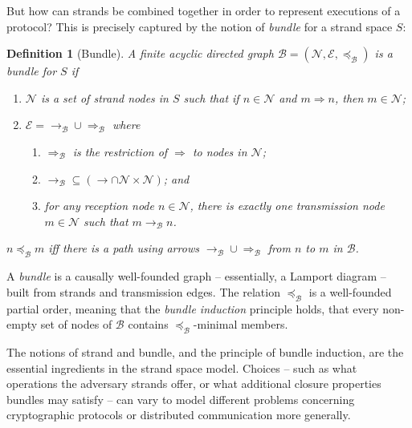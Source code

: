\documentclass[copyright]{eptcs}
\newcommand{\bnd}{\mathcal{B}}
\newtheorem{definition}{Definition}
\begin{document}
But how can strands be combined together in order to represent
executions of a protocol? This is precisely captured by the notion of
{\em bundle} for a strand space $S$:
\begin{definition}[Bundle] 
A finite acyclic directed graph
  $\bnd=(\mathcal{N},\mathcal{E},\preceq_{\bnd})$ is a \emph{bundle}
  for $S$ if
  \begin{enumerate}

  \item $\mathcal{N}$ is a set of strand nodes in $S$ such that if
    $n\in\mathcal{N}$ and $m\Rightarrow n$, then $m\in\mathcal{N}$;
    
  \item $\mathcal{E}=\rightarrow_{\bnd}\cup\Rightarrow_{\bnd}$ where
  \begin{enumerate}
    \item $\Rightarrow_{\bnd}$ is the restriction of $\Rightarrow$ to
    nodes in $\mathcal{N}$;
    \item $\rightarrow_{\bnd}\subseteq(\rightarrow\cap\mathcal{N} \times
    \mathcal{N})$; and
    \item for any reception node $n\in\mathcal{N}$, there is exactly
    one transmission node $m\in\mathcal{N}$ such that
    $m\rightarrow_{\bnd}n$.
  \end{enumerate}

  \end{enumerate}
  $n\preceq_{\bnd} m$ iff there is a path using arrows
  $\rightarrow_{\bnd}\cup\Rightarrow_{\bnd}$ from $n$ to $m$ in
  $\bnd$.
\end{definition}
A \emph{bundle} is a causally well-founded graph -- essentially, a
Lamport diagram -- built from strands and transmission edges.  The
relation $\preceq_{\bnd}$ is a well-founded partial order, meaning
that the \emph{bundle induction} principle holds, that every non-empty
set of nodes of $\bnd$ contains $\preceq_{\bnd}$-minimal members.

The notions of strand and bundle, and the principle of bundle
induction, are the essential ingredients in the strand space model.
Choices -- such as what operations the adversary strands offer, or what additional
closure properties bundles may satisfy -- can vary to model different
problems concerning cryptographic protocols or distributed
communication more generally.

\smallskip
\end{document}
